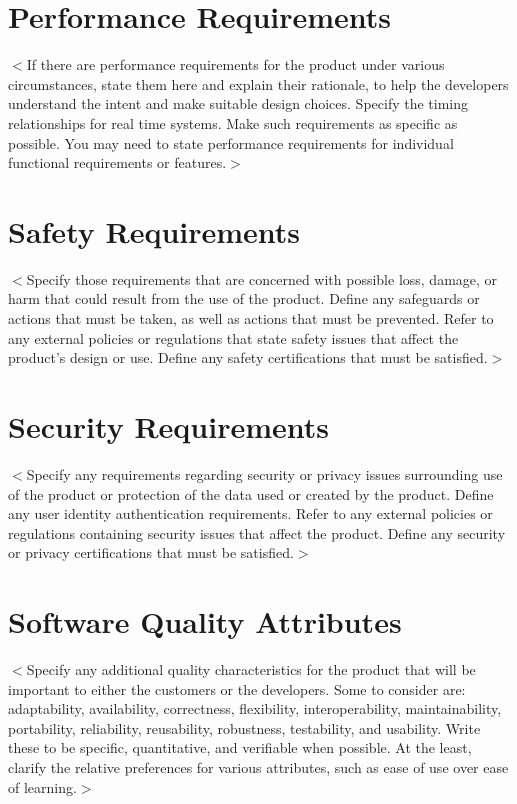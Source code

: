 \documentclass{scrreprt}
\begin{document}
\section{Performance Requirements}
$<$If there are performance requirements for the product under various 
circumstances, state them here and explain their rationale, to help the 
developers understand the intent and make suitable design choices. Specify the 
timing relationships for real time systems. Make such requirements as specific 
as possible. You may need to state performance requirements for individual 
functional requirements or features.$>$

\section{Safety Requirements}
$<$Specify those requirements that are concerned with possible loss, damage, or 
harm that could result from the use of the product. Define any safeguards or 
actions that must be taken, as well as actions that must be prevented. Refer to 
any external policies or regulations that state safety issues that affect the 
product’s design or use. Define any safety certifications that must be 
satisfied.$>$

\section{Security Requirements}
$<$Specify any requirements regarding security or privacy issues surrounding use 
of the product or protection of the data used or created by the product. Define 
any user identity authentication requirements. Refer to any external policies or 
regulations containing security issues that affect the product. Define any 
security or privacy certifications that must be satisfied.$>$

\section{Software Quality Attributes}
$<$Specify any additional quality characteristics for the product that will be 
important to either the customers or the developers. Some to consider are: 
adaptability, availability, correctness, flexibility, interoperability, 
maintainability, portability, reliability, reusability, robustness, testability, 
and usability. Write these to be specific, quantitative, and verifiable when 
possible. At the least, clarify the relative preferences for various attributes, 
such as ease of use over ease of learning.$>$
\end{document}
